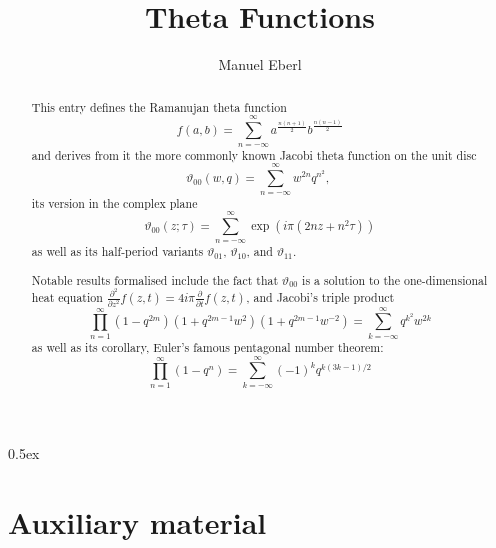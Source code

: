 \documentclass[11pt,a4paper]{article}
\begin{document}
\title{Theta Functions}
\author{Manuel Eberl}
\maketitle

\begin{abstract}
This entry defines the Ramanujan theta function
\[f(a,b) = \sum_{n=-\infty}^\infty a^{\frac{n(n+1)}{2}} b^{\frac{n(n-1)}{2}}\]
and derives from it the more commonly known Jacobi theta function on the unit disc
\[\vartheta_{00}(w,q) = \sum_{n=-\infty}^\infty w^{2n} q^{n^2},\ \]
its version in the complex plane
\[\vartheta_{00}(z;\tau) = \sum_{n=-\infty}^\infty \exp(i\pi (2nz + n^2\tau))\]
as well as its half-period variants $\vartheta_{01}$, $\vartheta_{10}$, and $\vartheta_{11}$.

Notable results formalised include the fact that $\vartheta_{00}$ is a solution to the 
one-dimensional heat equation $\frac{\partial^2}{\partial z^2} f(z,t) = 
    4i\pi \frac{\partial}{\partial t} f(z,t)$, and Jacobi's triple product
\[\prod_{n=1}^\infty (1-q^{2m})(1+q^{2m-1}w^2)(1+q^{2m-1}w^{-2}) = 
  \sum_{k=-\infty}^\infty q^{k^2}w^{2k}\]
as well as its corollary, Euler's famous pentagonal number theorem:
\[\prod_{n=1}^\infty (1-q^n) = \sum_{k=-\infty}^\infty (-1)^k q^{k(3k-1)/2}\]
\end{abstract}

\newpage

\tableofcontents

\newpage
\parindent 0pt\parskip 0.5ex

\section{Auxiliary material}



\raggedright
\nocite{brent2020}
\nocite{borwein1987}



\end{document}

